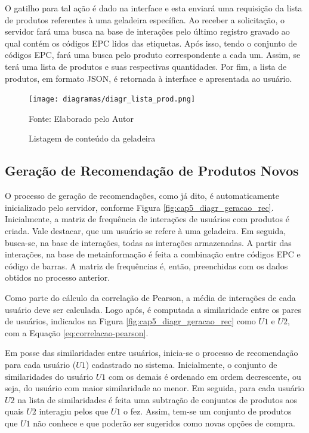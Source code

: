 O gatilho para tal ação é dado na interface e esta enviará uma requisição da lista de produtos referentes à uma geladeira específica. Ao receber a solicitação, o servidor fará uma busca na base de interações pelo último registro gravado ao qual contém os códigos EPC lidos das etiquetas. Após isso, tendo o conjunto de códigos EPC, fará uma busca pelo produto correspondente a cada um. Assim, se terá uma lista de produtos e suas respectivas quantidades. Por fim, a lista de produtos, em formato JSON, é retornada à interface e apresentada ao usuário.

\begin{figure}[htb]
    \caption{Listagem de conteúdo da geladeira}
    \label{fig:cap5_diagr_lista_prod}
    \texttt{[image: diagramas/diagr\_lista\_prod.png]}
    
    \footnotesize{Fonte: Elaborado pelo Autor}
\end{figure}

\subsection{Geração de Recomendação de Produtos Novos} \label{ssec:geracao_rec_novo}

O processo de geração de recomendações, como já dito, é automaticamente inicializado pelo servidor, conforme Figura \ref{fig:cap5_diagr_geracao_rec}. Inicialmente, a matriz de frequência de interações de usuários com produtos é criada. Vale destacar, que um usuário se refere à uma geladeira. Em seguida, busca-se, na base de interações, todas as interações armazenadas. A partir das interações, na base de metainformação é feita a combinação entre códigos EPC e código de barras. A matriz de frequências é, então, preenchidas com os dados obtidos no processo anterior.

Como parte do cálculo da correlação de Pearson, a média de interações de cada usuário deve ser calculada. Logo após, é computada a similaridade entre os pares de usuários, indicados na Figura \ref{fig:cap5_diagr_geracao_rec} como $U1$ e $U2$, com a Equação \ref{eq:correlacao-pearson}.

Em posse das similaridades entre usuários, inicia-se o processo de recomendação para cada usuário ($U1$) cadastrado no sistema. Inicialmente, o conjunto de similaridades do usuário $U1$ com os demais é ordenado em ordem decrescente, ou seja, do usuário com maior similaridade ao menor. Em seguida, para cada usuário $U2$ na lista de similaridades é feita uma subtração de conjuntos de produtos aos quais $U2$ interagiu pelos que $U1$ o fez. Assim, tem-se um conjunto de produtos que $U1$ não conhece e que poderão ser sugeridos como novas opções de compra. 

